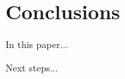 \documentclass[12pt, letterpaper]{article}
\begin{document}






\section{Conclusions}
In this paper...

Next steps...



{}

\end{document}
